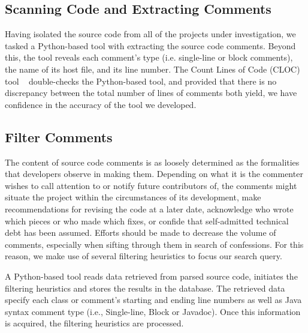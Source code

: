 \begin{landscape}
\begin{table}[htbp]
\begin{adjustbox}{width=1.3\textwidth}
		\end{adjustbox}
		
	\end{table}
	
\end{landscape}


\subsection{Scanning Code and Extracting Comments}

Having isolated the source code from all of the projects under investigation, we tasked a Python-based tool with extracting the source code comments. Beyond this, the tool reveals each comment's type (i.e. single-line or block comments), the name of its host file, and its line number. The Count Lines of Code (CLOC) tool ~\cite{cloc} double-checks the Python-based tool, and provided that there is no discrepancy between the total number of lines of comments both yield, we have confidence in the accuracy of the tool we developed.

\subsection{Filter Comments}


The content of source code comments is as loosely determined as the formalities that developers observe in making them. Depending on what it is the commenter wishes to call attention to or notify future contributors of, the comments might situate the project within the circumstances of its development, make recommendations for revising the code at a later date, acknowledge who wrote which pieces or who made which fixes, or confide that self-admitted technical debt has been assumed. Efforts should be made to decrease the volume of comments, especially when sifting through them in search of \SATD confessions. For this reason, we make use of several filtering heuristics to focus our search query.\par

A Python-based tool reads data retrieved from parsed source code, initiates the filtering heuristics and stores the results in the database. The retrieved data specify each class or comment's starting and ending line numbers as well as Java syntax comment type (i.e., Single-line, Block or Javadoc). Once this information is acquired, the filtering heuristics are processed. \par

